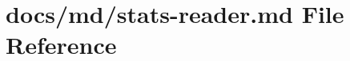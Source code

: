 \hypertarget{stats-reader_8md}{}\section{docs/md/stats-\/reader.md File Reference}
\label{stats-reader_8md}
